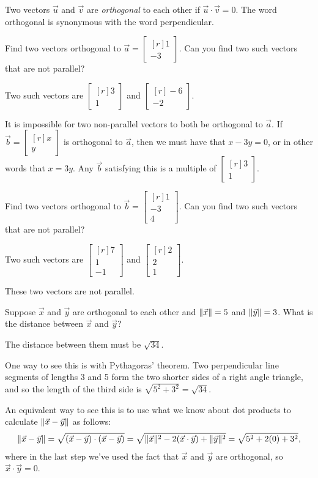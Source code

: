 \documentclass{problemset}
\newcommand{\mat}[1]{\begin{bmatrix*}[r]#1\end{bmatrix*}}
\DeclarePairedDelimiter\norm{\lVert}{\rVert}
\begin{document}
	\begin{definition}[Orthogonal]
		Two vectors $\vec u$ and $\vec v$ are \emph{orthogonal} to each other
		if $\vec u\cdot \vec v=0$.  The word orthogonal is synonymous with the
		word perpendicular.
	\end{definition}
	
	\question
	\begin{parts}
		\item Find two vectors orthogonal to $\vec a=\mat{1\\-3}$.  Can you find 
			two such vectors that are not parallel?
			\begin{solution}
				Two such vectors are $\mat{3\\1}$ and $\mat{-6\\-2}$. 

				It is impossible for two non-parallel vectors to both be
				orthogonal to $\vec a$. If $\vec b = \mat{x\\y}$ is orthogonal to
				$\vec a$, then we must have that $x - 3y = 0$, or in other words 
				that $x = 3y$. Any $\vec b$ satisfying this is a multiple of 
				$\mat{3\\1}$. 
			\end{solution}
		\item Find two vectors orthogonal to $\vec b=\mat{1\\-3\\4}$.  Can you 
			find two such vectors that are not parallel?
			\begin{solution}
				Two such vectors are $\mat{7\\1\\-1}$ and $\mat{2\\2\\1}$.

				These two vectors are not parallel. 
			\end{solution}
		\item Suppose $\vec x$ and $\vec y$ are orthogonal to each other and 
			$\norm{\vec x}=5$ and $\norm{\vec y}=3$. What is the distance between 
			$\vec x$ and $\vec y$?
			\begin{solution}
				The distance between them must be $\sqrt{34}$. 

				One way to see this is with Pythagoras' theorem. Two perpendicular 
				line segments of lengths 3 and 5 form the two shorter sides of a 
				right angle triangle, and so the length of the third side is
				$\sqrt{5^2 + 3^2} = \sqrt{34}$. 

				An equivalent way to see this is to use what we know about dot 
				products to calculate $\norm{\vec x-\vec y}$ as follows:
				\[
					\norm{\vec x-\vec y} = \sqrt{(\vec x-\vec y)\cdot(\vec x-\vec y)}
					= \sqrt{\norm{\vec x}^2 - 2(\vec x\cdot\vec y) + \norm{\vec y}^2}
					= \sqrt{5^2 + 2(0) + 3^2},
				\]
				where in the last step we've used the fact that $\vec x$ and $\vec y$
				are orthogonal, so $\vec x\cdot\vec y = 0$. 
			\end{solution}
	\end{parts}
\end{document}
